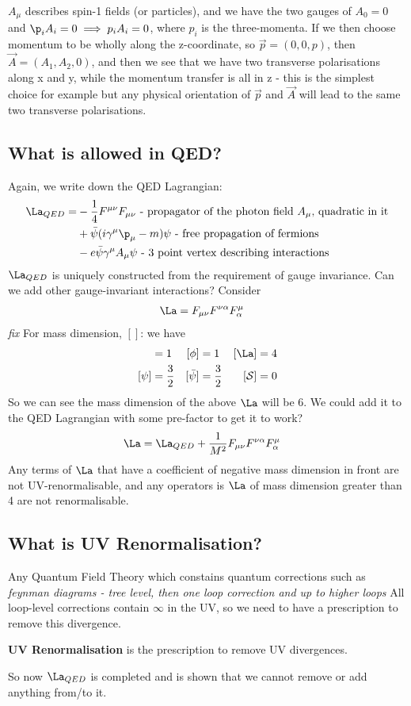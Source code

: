 \documentclass[relqm.tex]{subfiles}
\begin{document}
$A_\mu$ describes spin-1 fields (or particles), and we have the two gauges of $A_0 = 0$ and $\p_i A_i = 0 \implies p_i A_i = 0$, where $p_i$ is the three-momenta.
If we then choose momentum to be wholly along the z-coordinate, so $\vec{p}=(0,0,p)$, then $\vec{A} = (A_1,A_2,0)$, and then we see that we have two transverse polarisations along x and y, while the momentum transfer is all in z - this is the simplest choice for example but any physical orientation of $\vec{p}$ and $\vec{A}$ will lead to the same two transverse polarisations.

\subsection{What is allowed in QED?}
Again, we write down the QED Lagrangian:
\begin{align}
    \La_{QED} = &-\frac14 F^{\mu\nu}F_{\mu\nu} \text{ - propagator of the photon field $A_\mu$, quadratic in it} \nonumber \\
                &+ \bar{\psi}(i\gamma^\mu\p_\mu -m)\psi \text{ - free propagation of fermions} \nonumber \\
                &- e\bar{\psi}\gamma^\mu A_\mu\psi \text{ - 3 point vertex describing interactions}
\end{align}
$\La_{QED}$ is uniquely constructed from the requirement of gauge invariance. 
Can we add other gauge-invariant interactions?
Consider
\begin{align}
    \La &= F_{\mu\nu}F^{\nu\alpha}F_\alpha^\mu
\end{align}
\textit{fix}
For mass dimension, $[]$: we have
\begin{align}
    [A_\mu] &= 1 & [\phi] & = 1 & [\La] &= 4 \\
    [\psi] &= \frac32 & [\bar{\psi}] &= \frac32 & [\mathcal{S}] &= 0 
\end{align}
So we can see the mass dimension of the above $\La$ will be 6. 
We could add it to the QED Lagrangian with some pre-factor to get it to work?
\begin{align}
    \La &= \La_{QED} + \frac{1}{M^2}F_{\mu\nu}F^{\nu\alpha}F_\alpha^\mu
\end{align}
Any terms of $\La$ that have a coefficient of negative mass dimension in front are not UV-renormalisable, and any operators is $\La$ of mass dimension greater than 4 are not renormalisable. 

\subsection{What is UV Renormalisation?}
Any Quantum Field Theory which constains quantum corrections such as
\textit{feynman diagrams - tree level, then one loop correction and up to higher loops}
All loop-level corrections contain $\infty$ in the UV, so we need to have a prescription to remove this divergence.

\textbf{UV Renormalisation} is the prescription to remove UV divergences.

So now $\La_{QED}$ is completed and is shown that we cannot remove or add anything from/to it. 
\end{document}
